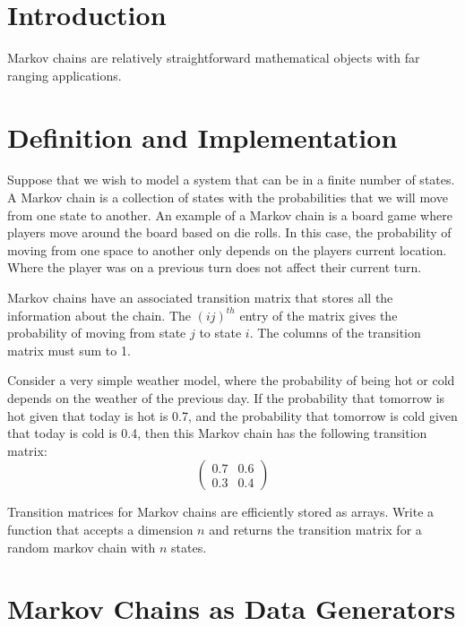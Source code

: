 \label{lab:Markov}

\objective{}

\section*{Introduction}
Markov chains are relatively straightforward mathematical objects with far ranging applications.

\section*{Definition and Implementation}

Suppose that we wish to model a system that can be in a finite number of states.
A Markov chain is a collection of states with the probabilities that we will move from one state to another.
An example of a Markov chain is a board game where players move around the board based on die rolls.
In this case, the probability of moving from one space to another only depends on the players current location.
Where the player was on a previous turn does not affect their current turn.

Markov chains have an associated transition matrix that stores all the information about the chain.
The $(ij)^{th}$ entry of the matrix gives the probability of moving from state $j$ to state $i$.
The columns of the transition matrix must sum to 1.

Consider a very simple weather model, where the probability of being hot or cold depends on the weather of the previous day.
If the probability that tomorrow is hot given that today is hot is 0.7, and the probability that tomorrow is cold given that today is cold is 0.4, then this Markov chain has the following transition matrix:
\[ \left( \begin{array}{cc}
0.7 & 0.6 \\
0.3 & 0.4 \end{array} \right)\] 

\begin{problem}
Transition matrices for Markov chains are efficiently stored as  arrays.
Write a function that accepts a dimension $n$ and returns the transition matrix for a random markov chain with $n$ states.
\end{problem}

\section*{Markov Chains as Data Generators}


